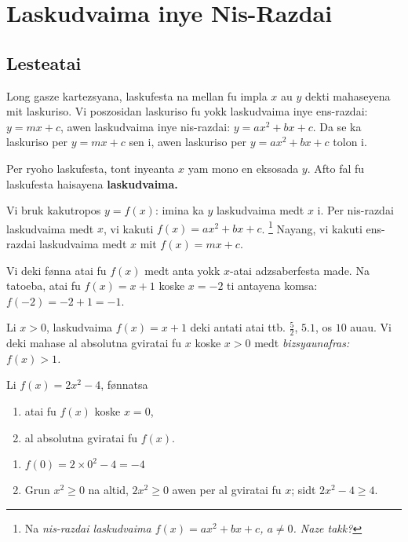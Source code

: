 \chapter{Laskudvaima inye Nis-Razdai}

\section{Lesteatai}

Long gasze kartezsyana, laskufesta na mellan fu impla \(x\) au \(y\) dekti mahaseyena mit laskuriso.
Vi poszosidan laskuriso fu yokk laskudvaima inye ens-razdai: \(y = mx + c\), awen laskudvaima inye
nis-razdai: \(y = ax^2 + bx + c\). Da se ka laskuriso per \(y = mx + c\) sen i, awen laskuriso per
\(y = ax^2 + bx + c\) tolon i.

Per ryoho laskufesta, tont inyeanta \(x\) yam mono en eksosada \(y\).
Afto fal fu laskufesta haisayena \bf{laskudvaima}.

Vi bruk kakutropos \(y = f\left(x\right)\): imina ka \(y\) laskudvaima medt \(x\) i.
Per nis-razdai laskudvaima medt \(x\), vi kakuti
\(f\left(x\right) = ax^2 + bx + c\). \footnote{Na \it{nis-razdai} laskudvaima \(f\left(x\right)=ax^2+bx+c\), \(a\neq0\). Naze takk?}
Nayang, vi kakuti ens-razdai laskudvaima medt \(x\) mit \(f\left(x\right) = mx + c\).

Vi deki fønna atai fu \(f\left(x\right)\) medt anta yokk \(x\)-atai adzsaberfesta made.
Na tatoeba, atai fu \(f\left(x\right) = x + 1\) koske \(x = -2\) ti antayena komsa: \(f\left(-2\right)=-2+1=-1\).

Li \(x > 0\), laskudvaima \(f\left(x\right) = x + 1\) deki antati atai ttb. \(\frac{5}{2}\), \(5.1\), os \(10\) auau.
Vi deki mahase al absolutna gviratai fu \(x\) koske \(x > 0\) medt \it{bizsyaunafras}: \(f\left(x\right) > 1\).

\begin{tatoeba}
  Li \(f\left(x\right)=2x^2-4\), fønnatsa
  \begin{enumerate}
    \item atai fu \(f\left(x\right)\) koske \(x=0\),
    \item al absolutna gviratai fu \(f\left(x\right)\).
  \end{enumerate}

  \tcblower

  \begin{enumerate}
    \item \(f\left(0\right) = 2\times0^2 - 4 = -4\)
    \item Grun \(x^2\geq0\) na altid, \(2x^2\geq0\) awen per al gviratai fu \(x\); sidt \(2x^2-4\geq4\).
  \end{enumerate}
\end{tatoeba}

